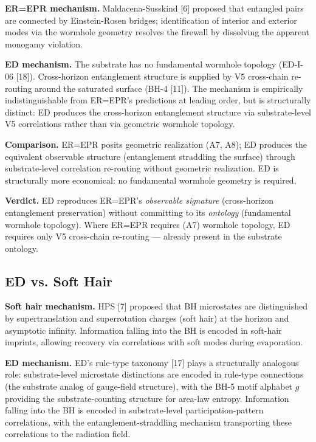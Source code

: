 \documentclass[11pt,a4paper]{article}
\begin{document}
\textbf{ER=EPR mechanism.} Maldacena-Susskind [6] proposed that entangled pairs are connected by Einstein-Rosen bridges; identification of interior and exterior modes via the wormhole geometry resolves the firewall by dissolving the apparent monogamy violation.

\textbf{ED mechanism.} The substrate has no fundamental wormhole topology (ED-I-06 [18]). Cross-horizon entanglement structure is supplied by V5 cross-chain re-routing around the saturated surface (BH-4 [11]). The mechanism is empirically indistinguishable from ER=EPR's predictions at leading order, but is structurally distinct: ED produces the cross-horizon entanglement structure via substrate-level V5 correlations rather than via geometric wormhole topology.

\textbf{Comparison.} ER=EPR posits geometric realization (A7, A8); ED produces the equivalent observable structure (entanglement straddling the surface) through substrate-level correlation re-routing without geometric realization. ED is structurally more economical: no fundamental wormhole geometry is required.

\textbf{Verdict.} ED reproduces ER=EPR's \emph{observable signature} (cross-horizon entanglement preservation) without committing to its \emph{ontology} (fundamental wormhole topology). Where ER=EPR requires (A7) wormhole topology, ED requires only V5 cross-chain re-routing --- already present in the substrate ontology.

\subsection{ED vs. Soft Hair}

\textbf{Soft hair mechanism.} HPS [7] proposed that BH microstates are distinguished by supertranslation and superrotation charges (soft hair) at the horizon and asymptotic infinity. Information falling into the BH is encoded in soft-hair imprints, allowing recovery via correlations with soft modes during evaporation.

\textbf{ED mechanism.} ED's rule-type taxonomy [17] plays a structurally analogous role: substrate-level microstate distinctions are encoded in rule-type connections (the substrate analog of gauge-field structure), with the BH-5 motif alphabet $g$ providing the substrate-counting structure for area-law entropy. Information falling into the BH is encoded in substrate-level participation-pattern correlations, with the entanglement-straddling mechanism transporting these correlations to the radiation field.
\end{document}
